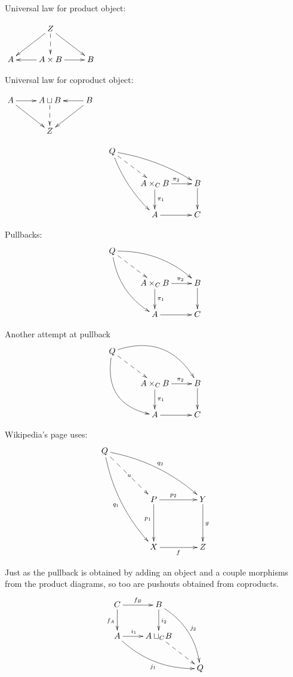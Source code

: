 \documentclass{article}
\begin{document}
\M
Universal law for product object:

$\xymatrix{
&\ar[dl] Z  \ar@{-->}[d] \ar[dr]&\\
  A  & \ar[l]A\times B\ar[r] &  B}$

\M
Universal law for coproduct object:

$\xymatrix{
  A\ar[dr]\ar[r]  & A\sqcup B\ar@{-->}[d] & \ar[l]\ar[dl] B\\
& Z &
}$

$$\xymatrix{
  Q \ar@{-->}[dr]\ar@/^/[drr]\ar@/_/[ddr] &                 &\\
                                  & A\times_{C}B \ar[d]^{\pi_{1}} \ar[r]^{\pi_{2}} & B \ar[d] \\
                                  & A \ar[r]        & C }$$

\M
Pullbacks:
$$\xymatrix{
  Q \ar@{-->}[dr]\ar@/^1pc/[drr]\ar@/_1pc/[ddr] &                 &\\
                                  & A\times_{C}B \ar[d]^{\pi_{1}} \ar[r]^(0.6){\pi_{2}} & B \ar[d] \\
                                  & A \ar[r]        & C }$$


\M
Another attempt at pullback
$$\xymatrix{
  Q \ar@{-->}[dr]\ar@/^2pc/[drr]\ar@/_2pc/[ddr] &                 &\\
                                  & A\times_{C}B \ar[d]^{\pi_{1}} \ar[r]^(0.6){\pi_{2}} & B \ar[d] \\
                                  & A \ar[r]        & C }$$


\M Wikipedia's page uses:
\begin{equation*}
  \xymatrix@C+2em@R+2em{
    Q \ar@/_10pt/[ddr]_{q_1}%
    \ar@/^10pt/[drr]^{q_2}%
    \ar@{-->}[dr]|*+<3pt,3pt>{\scriptstyle u} & & \\
   & P \ar[d]_(0.4){p_1} \ar[r]^(0.4){p_2} & Y \ar[d]^{g}\\
   & X \ar[r]_{f} & Z
  }
\end{equation*}

Just as the pullback is obtained by adding an object and a couple
morphisms from the product diagrams, so too are pushouts obtained from
coproducts.
\begin{equation*}
\xymatrix{C \ar[d]_{f_{A}} \ar[r]^{f_{B}} & B\ar[d]^{i_{2}}\ar@/^1pc/[ddr]^{j_{2}} &\\
  A \ar[r]^(0.4){i_{1}} \ar@/_1pc/[drr]_{j_{1}} & {A\sqcup_{C}\!B} \ar@{-->}[dr] &\\
 & & Q}
\end{equation*}
\end{document}
